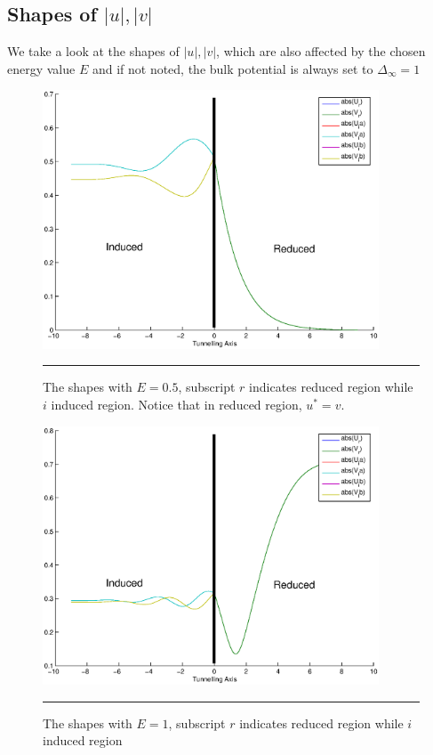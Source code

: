 \subsection{Shapes of $|u|,|v|$}
We  take a look at the shapes of $|u|,|v|$, which are also affected by the chosen energy value $E$ and if not noted, the bulk potential is always set to $\Delta_{\infty}=1$
\begin{figure}[htbp]
\small
	\centering
		\includegraphics[width=10cm]{./Figures/3-2-2.eps}
		\rule{35em}{0.5pt}
	\caption[An Electron]{The shapes with $E=0.5$, subscript $r$ indicates reduced region while $i$ induced region. Notice that in reduced region, $u^*=v$.}
	\label{fig:Electron}
\end{figure}
 \begin{figure}[htbp]
\small
	\centering
		\includegraphics[width=10cm]{./Figures/3-2-3.eps}
		\rule{35em}{0.5pt}
	\caption[An Electron]{The shapes with $E=1$, subscript $r$ indicates reduced region while $i$ induced region}
	\label{fig:Electron}
\end{figure}


